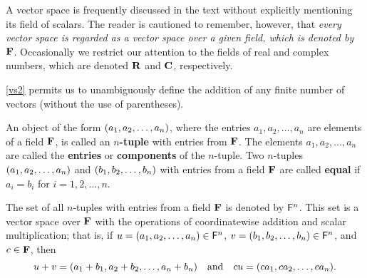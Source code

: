 \begin{note}
    A vector space is frequently discussed in the text without explicitly mentioning its field of scalars.
    The reader is cautioned to remember, however, that \emph{every vector space is regarded as a vector space over a given field, which is denoted by \(\mathbf{F}\)}.
    Occasionally we restrict our attention to the fields of real and complex numbers, which are denoted \(\mathbf{R}\) and \(\mathbf{C}\), respectively.
\end{note}

\begin{note}
    \ref{vs2} permits us to unambiguously define the addition of any finite number of vectors
    (without the use of parentheses).
\end{note}

\begin{defn}\label{1.2.3}
    An object of the form \({\left\lparen{a}_{1}, {a}_{2}, \dots, {a}_{n}\right\rparen}\), where the entries \(a_{1}, a_{2}, \dots, a_{n}\) are elements of a field \(\mathbf{F}\), is called an \textbf{\(n\)-tuple} with entries from \(\mathbf{F}\).
    The elements \(a_{1}, a_{2}, \dots, a_{n}\) are called the \textbf{entries} or \textbf{components} of the \(n\)-tuple.
    Two \(n\)-tuples \({\left\lparen{a}_{1}, {a}_{2}, \dots, {a}_{n}\right\rparen}\) and \({\left\lparen{b}_{1}, {b}_{2}, \dots, {b}_{n}\right\rparen}\) with entries from a field \(\mathbf{F}\) are called \textbf{equal} if \(a_i = b_i\) for \(i = 1, 2, \dots, n\).
\end{defn}

\begin{eg}\label{1.2.4}
    The set of all \(n\)-tuples with entries from a field \(\mathbf{F}\) is denoted by \(\mathsf{F}^{n}\).
    This set is a vector space over \(\mathbf{F}\) with the operations of coordinatewise addition and scalar multiplication;
    that is, if \(u = {\left\lparen{a}_{1}, {a}_{2}, \dots, {a}_{n}\right\rparen} \in \mathsf{F}^{n}\), \(v = {\left\lparen{b}_{1}, {b}_{2}, \dots, {b}_{n}\right\rparen} \in \mathsf{F}^{n}\), and \(c \in \mathbf{F}\), then
    \[
        u + v = (a_{1} + b_{1}, a_{2} + b_{2}, \dots, a_{n} + b_{n}) \quad \text{and} \quad cu = {\left\lparen{ca}_{1}, {ca}_{2}, \dots, {ca}_{n}\right\rparen}.
    \]
\end{eg}

